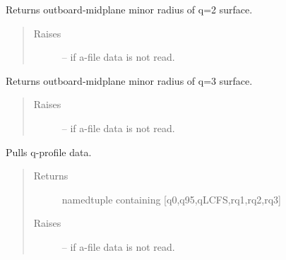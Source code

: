 \documentclass[letterpaper,10pt,english]{sphinxmanual}
\begin{document}
\begin{fulllineitems}

\begin{fulllineitems}
\label{eqtools:eqtools.eqdskreader.EqdskReader.getQ2Surf}
Returns outboard-midplane minor radius of q=2 surface.
\begin{quote}\begin{description}
\item[{Raises}] \leavevmode
{} -- 
if a-file data is not read.

\end{description}\end{quote}

\end{fulllineitems}


\begin{fulllineitems}
\label{eqtools:eqtools.eqdskreader.EqdskReader.getQ3Surf}
Returns outboard-midplane minor radius of q=3 surface.
\begin{quote}\begin{description}
\item[{Raises}] \leavevmode
{} -- 
if a-file data is not read.

\end{description}\end{quote}

\end{fulllineitems}


\begin{fulllineitems}
\label{eqtools:eqtools.eqdskreader.EqdskReader.getQs}
Pulls q-profile data.
\begin{quote}\begin{description}
\item[{Returns}] \leavevmode
namedtuple containing {[}q0,q95,qLCFS,rq1,rq2,rq3{]}

\item[{Raises}] \leavevmode
{} -- 
if a-file data is not read.

\end{description}\end{quote}


\end{fulllineitems}
\end{fulllineitems}
\end{document}
